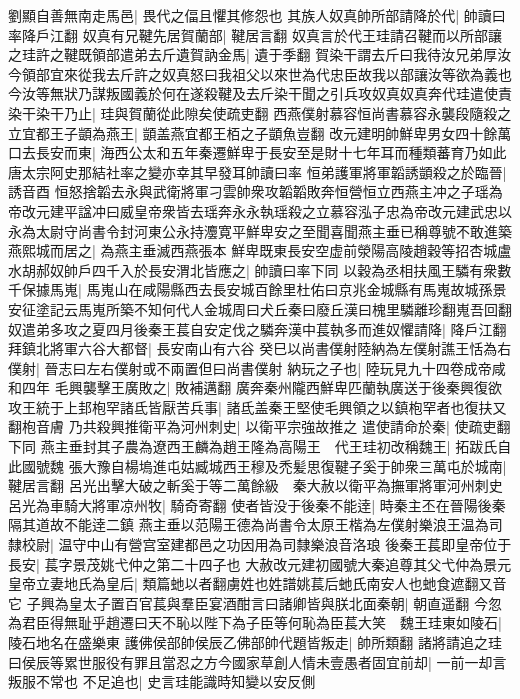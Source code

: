 劉顯自善無南走馬邑|{
	畏代之偪且懼其修怨也}
其族人奴真帥所部請降於代|{
	帥讀曰率降戶江翻}
奴真有兄鞬先居賀蘭部|{
	鞬居言翻}
奴真言於代王珪請召鞬而以所部讓之珪許之鞬既領部遣弟去斤遺賀訥金馬|{
	遺于季翻}
賀染干謂去斤曰我待汝兄弟厚汝今領部宜來從我去斤許之奴真怒曰我祖父以來世為代忠臣故我以部讓汝等欲為義也今汝等無狀乃謀叛國義於何在遂殺鞬及去斤染干聞之引兵攻奴真奴真奔代珪遣使責染干染干乃止|{
	珪與賀蘭從此隙矣使疏吏翻}
西燕僕射慕容恒尚書慕容永襲段隨殺之立宜都王子顗為燕王|{
	顗盖燕宜都王栢之子顗魚豈翻}
改元建明帥鮮卑男女四十餘萬口去長安而東|{
	海西公太和五年秦遷鮮卑于長安至是財十七年耳而種類蕃育乃如此唐太宗阿史那結社率之變亦幸其早發耳帥讀曰率}
恒弟護軍將軍韜誘顗殺之於臨晉|{
	誘音酉}
恒怒捨韜去永與武衛將軍刁雲帥衆攻韜韜敗奔恒營恒立西燕主冲之子瑶為帝改元建平諡冲曰威皇帝衆皆去瑶奔永永執瑶殺之立慕容泓子忠為帝改元建武忠以永為太尉守尚書令封河東公永持灋寛平鮮卑安之至聞喜聞燕主垂已稱尊號不敢進築燕熙城而居之|{
	為燕主垂滅西燕張本}
鮮卑既東長安空虚前滎陽高陵趙穀等招杏城盧水胡郝奴帥戶四千入於長安渭北皆應之|{
	帥讀曰率下同}
以穀為丞相扶風王驎有衆數千保據馬嵬|{
	馬嵬山在咸陽縣西去長安城百餘里杜佑曰京兆金城縣有馬嵬故城孫景安征塗記云馬嵬所築不知何代人金城周曰犬丘秦曰廢丘漢曰槐里驎離珍翻嵬吾回翻}
奴遣弟多攻之夏四月後秦王萇自安定伐之驎奔漢中萇執多而進奴懼請降|{
	降戶江翻}
拜鎮北將軍六谷大都督|{
	長安南山有六谷}
癸巳以尚書僕射陸納為左僕射譙王恬為右僕射|{
	晉志曰左右僕射或不兩置但曰尚書僕射}
納玩之子也|{
	陸玩見九十四卷成帝咸和四年}
毛興襲擊王廣敗之|{
	敗補邁翻}
廣奔秦州隴西鮮卑匹蘭執廣送于後秦興復欲攻王統于上邽枹罕諸氐皆厭苦兵事|{
	諸氐盖秦王堅使毛興領之以鎮枹罕者也復扶又翻枹音膚}
乃共殺興推衛平為河州刺史|{
	以衛平宗強故推之}
遣使請命於秦|{
	使疏吏翻下同}
燕主垂封其子農為遼西王麟為趙王隆為高陽王　代王珪初改稱魏王|{
	拓跋氏自此國號魏}
張大豫自楊塢進屯姑臧城西王穆及禿髪思復鞬子奚于帥衆三萬屯於城南|{
	鞬居言翻}
呂光出擊大破之斬奚于等二萬餘級　秦大赦以衛平為撫軍將軍河州刺史呂光為車騎大將軍凉州牧|{
	騎奇寄翻}
使者皆没于後秦不能逹|{
	時秦主丕在晉陽後秦隔其道故不能逹二鎮}
燕主垂以范陽王德為尚書令太原王楷為左僕射樂浪王温為司隸校尉|{
	温守中山有營宫室建都邑之功因用為司隸樂浪音洛琅}
後秦王萇即皇帝位于長安|{
	萇字景茂姚弋仲之第二十四子也}
大赦改元建初國號大秦追尊其父弋仲為景元皇帝立妻地氏為皇后|{
	類篇虵以者翻虜姓也姓譜姚萇后虵氏南安人也虵食遮翻又音它}
子興為皇太子置百官萇與羣臣宴酒酣言曰諸卿皆與朕北面秦朝|{
	朝直遥翻}
今忽為君臣得無耻乎趙遷曰天不恥以陛下為子臣等何恥為臣萇大笑　魏王珪東如陵石|{
	陵石地名在盛樂東}
護佛侯部帥侯辰乙佛部帥代題皆叛走|{
	帥所類翻}
諸將請追之珪曰侯辰等累世服役有罪且當忍之方今國家草創人情未壹愚者固宜前却|{
	一前一却言叛服不常也}
不足追也|{
	史言珪能識時知變以安反側}

